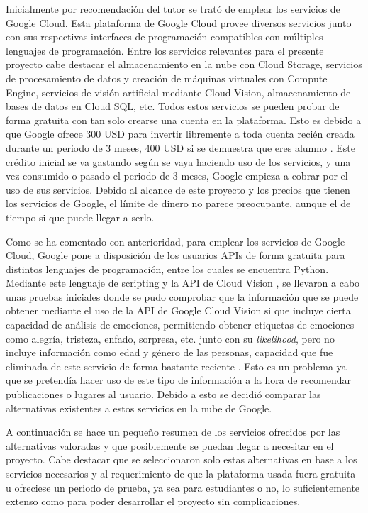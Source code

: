 Inicialmente por recomendación del tutor se trató de emplear los servicios de Google Cloud. Esta plataforma de Google Cloud provee diversos servicios junto con sus respectivas interfaces de programación compatibles con múltiples lenguajes de programación. Entre los servicios relevantes para el presente proyecto cabe destacar el almacenamiento en la nube con Cloud Storage, servicios de procesamiento de datos y creación de máquinas virtuales con Compute Engine, servicios de visión artificial mediante Cloud Vision, almacenamiento de bases de datos en Cloud SQL, etc. Todos estos servicios se pueden probar de forma gratuita con tan solo crearse una cuenta en la plataforma. Esto es debido a que Google ofrece 300 USD para invertir libremente a toda cuenta recién creada durante un periodo de 3 meses, 400 USD si se demuestra que eres alumno \cite{google_cloud}. Este crédito inicial se va gastando según se vaya haciendo uso de los servicios, y una vez consumido o pasado el periodo de 3 meses, Google empieza a cobrar por el uso de sus servicios. Debido al alcance de este proyecto y los precios que tienen los servicios de Google, el límite de dinero no parece preocupante, aunque el de tiempo si que puede llegar a serlo.

Como se ha comentado con anterioridad, para emplear los servicios de Google Cloud, Google pone a disposición de los usuarios APIs de forma gratuita para distintos lenguajes de programación, entre los cuales se encuentra Python. Mediante este lenguaje de scripting y la API de Cloud Vision \cite{api_google_vision}, se llevaron a cabo unas pruebas iniciales donde se pudo comprobar que la información que se puede obtener mediante el uso de la API de Google Cloud Vision si que incluye cierta capacidad de análisis de emociones, permitiendo obtener etiquetas de emociones como alegría, tristeza, enfado, sorpresa, etc. junto con su \textit{likelihood}, pero no incluye información como edad y género de las personas, capacidad que fue eliminada de este servicio de forma bastante reciente  \cite{archive_google_gender}. Esto es un problema ya que se pretendía hacer uso de este tipo de información a la hora de recomendar publicaciones o lugares al usuario. Debido a esto se decidió comparar las alternativas existentes a estos servicios en la nube de Google.

A continuación se hace un pequeño resumen de los servicios ofrecidos por las alternativas valoradas y que posiblemente se puedan llegar a necesitar en el proyecto. Cabe destacar que se seleccionaron solo estas alternativas en base a los servicios necesarios y al requerimiento de que la plataforma usada fuera gratuita u ofreciese un periodo de prueba, ya sea para estudiantes o no, lo suficientemente extenso como para poder desarrollar el proyecto sin complicaciones.

